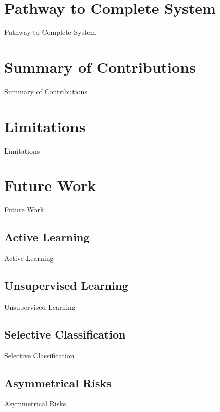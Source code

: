 \section{Pathway to Complete System}
Pathway to Complete System



\section{Summary of Contributions}
Summary of Contributions



\section{Limitations}
Limitations



\section{Future Work}
Future Work

\subsection{Active Learning}
Active Learning

\subsection{Unsupervised Learning}
Unsupervised Learning

\subsection{Selective Classification}
Selective Classification

\subsection{Asymmetrical Risks}
Asymmetrical Risks